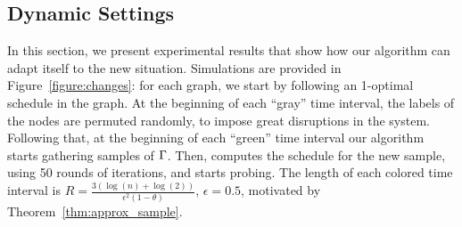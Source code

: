 
\subsection{Dynamic Settings}\label{sec:dynset}
In this section, we present experimental results that show
 how our algorithm can adapt itself to the new situation.
Simulations are provided in Figure~\ref{figure:changes}: for each graph, we
start by following an 1-optimal schedule in the graph. At the beginning of each
``gray'' time interval, the labels of the nodes are permuted randomly, to impose
great disruptions in the system. Following that, at
the beginning of each ``green'' time interval our algorithm starts gathering
samples of $\Gamma$. Then, \algonameapx computes the schedule for the new sample, using 50 rounds of iterations, and starts probing. The length of each colored time
interval is $R = \frac{3(\log(n)+\log(2))}{\epsilon^2(1-\theta)}$, $\epsilon=0.5$, motivated by
Theorem~\ref{thm:approx_sample}.


